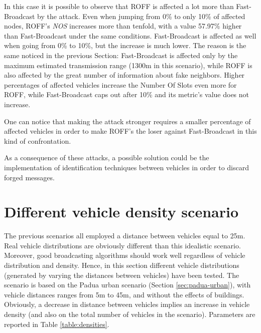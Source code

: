 			In this case it is possible to observe that ROFF is affected a lot more than Fast-Broadcast by the attack. Even when jumping from 0\% to only 10\% of affected nodes, ROFF's \textit{NOS} increases more than tenfold, with a value 57.97\% higher than Fast-Broadcast under the same conditions. Fast-Broadcast is affected as well when going from 0\% to 10\%, but the increase is much lower. The reason is the same noticed in the previous Section: Fast-Broadcast is affected only by the maximum estimated transmission range (1300m in this scenario), while ROFF is also affected by the great number of information about fake neighbors. Higher percentages of affected vehicles increase the Number Of Slots even more for ROFF, while Fast-Broadcast caps out after 10\% and its metric's value does not increase.
			
			
			One can notice that making the attack stronger requires a smaller percentage of affected vehicles in order to make ROFF's the loser against Fast-Broadcast in this kind of confrontation. 
			
			
			As a consequence of these attacks, a possible solution could be the implementation of identification techniques between vehicles in order to discard forged messages.
	
	\section{Different vehicle density scenario}
		The previous scenarios all employed a distance between vehicles equal to 25m. Real vehicle distributions are obviously different than this idealistic scenario. Moreover, good broadcasting algorithms should work well regardless of vehicle distribution and density. Hence, in this section different vehicle distributions (generated by varying the distances between vehicles) have been tested. The scenario is based on the Padua urban scenario (Section \ref{sec:padua-urban}), with vehicle distances ranges from 5m to 45m, and without the effects of buildings. Obviously, a decrease in distance between vehicles implies an increase in vehicle density (and also on the total number of vehicles in the scenario). Parameters are reported in Table \ref{table:densities}.
		
